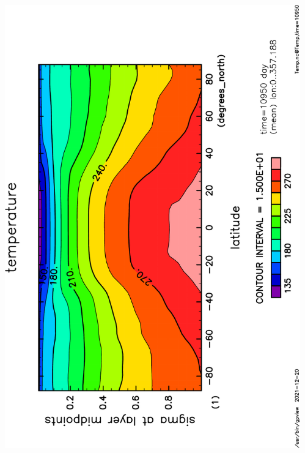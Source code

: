 \documentclass[aspectratio=149,9pt,fleqn]{beamer}
\begin{document}
\begin{frame}
\begin{columns}
\begin{column}{.4\textwidth}
		\end{column}
		\begin{column}{.4\textwidth}
			\includegraphics[height=\textwidth,angle=-90]{S1366Temp,time=10950-crop.pdf}
		\end{column}
	\end{columns}
\end{frame}
\end{document}
